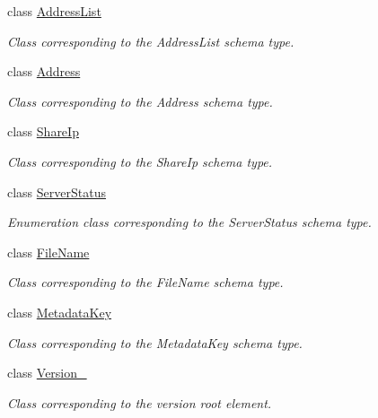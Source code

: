 \begin{DoxyCompactItemize}
class \hyperlink{classopenstack_1_1xml_1_1AddressList}{AddressList}
\begin{DoxyCompactList}\small\item\em Class corresponding to the AddressList schema type. \item\end{DoxyCompactList}\item 
class \hyperlink{classopenstack_1_1xml_1_1Address}{Address}
\begin{DoxyCompactList}\small\item\em Class corresponding to the Address schema type. \item\end{DoxyCompactList}\item 
class \hyperlink{classopenstack_1_1xml_1_1ShareIp}{ShareIp}
\begin{DoxyCompactList}\small\item\em Class corresponding to the ShareIp schema type. \item\end{DoxyCompactList}\item 
class \hyperlink{classopenstack_1_1xml_1_1ServerStatus}{ServerStatus}
\begin{DoxyCompactList}\small\item\em Enumeration class corresponding to the ServerStatus schema type. \item\end{DoxyCompactList}\item 
class \hyperlink{classopenstack_1_1xml_1_1FileName}{FileName}
\begin{DoxyCompactList}\small\item\em Class corresponding to the FileName schema type. \item\end{DoxyCompactList}\item 
class \hyperlink{classopenstack_1_1xml_1_1MetadataKey}{MetadataKey}
\begin{DoxyCompactList}\small\item\em Class corresponding to the MetadataKey schema type. \item\end{DoxyCompactList}\item 
class \hyperlink{classopenstack_1_1xml_1_1Version__}{Version\_\-}
\begin{DoxyCompactList}\small\item\em Class corresponding to the version root element. \item\end{DoxyCompactList}\item 

\end{DoxyCompactItemize}
